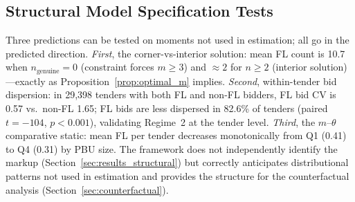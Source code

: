 
\subsection{Structural Model Specification Tests}
\label{sec:spec_tests}

Three predictions can be tested on moments not used in estimation; all go in the predicted direction.
\emph{First}, the corner-vs-interior solution: mean FL count is 10.7
when $n_{\text{genuine}} = 0$ (constraint forces $m \geq 3$) and
$\approx 2$ for $n \geq 2$ (interior solution)---exactly as
Proposition~\ref{prop:optimal_m} implies.
\emph{Second}, within-tender bid dispersion: in 29,398 tenders with
both FL and non-FL bidders, FL bid CV is 0.57 vs.\ non-FL 1.65; FL
bids are less dispersed in 82.6\% of tenders (paired $t = -104$,
$p < 0.001$), validating Regime~2 at the tender level.
\emph{Third}, the $m$--$\theta$ comparative static: mean FL per tender
decreases monotonically from Q1 (0.41) to Q4 (0.31) by PBU size.
The framework does not independently identify the markup
(Section~\ref{sec:results_structural}) but correctly anticipates
distributional patterns not used in estimation and provides the
structure for the counterfactual analysis
(Section~\ref{sec:counterfactual}).

